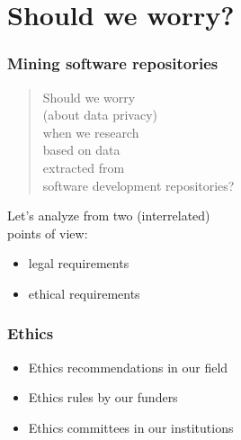\documentclass[17pt,aspectratio=169,hyperref={pdfusetitle,colorlinks,allcolors=olive}]{beamer}
\begin{document}
\section{Should we worry?}

\begin{frame}[fragile]
  \frametitle{Mining software repositories}

  \begin{quote}
    Should we worry \\
    (about data privacy) \\
    when we research \\
    based on data \\
    extracted from \\
    software development repositories?
  \end{quote}

\end{frame}

\begin{frame}[fragile]

  Let's analyze from two (interrelated) \\ points of view: \\

  \vspace{1cm}

  {\large
  \begin{itemize}
  \item legal requirements
  \item ethical requirements
  \end{itemize}
  }
  
\end{frame}

\begin{frame}[fragile]
  \frametitle{Ethics}

  \begin{itemize}
  \item Ethics recommendations in our field \\
  \item Ethics rules by our funders
  \item Ethics committees in our institutions
  \end{itemize}
\end{frame}
\end{document}
